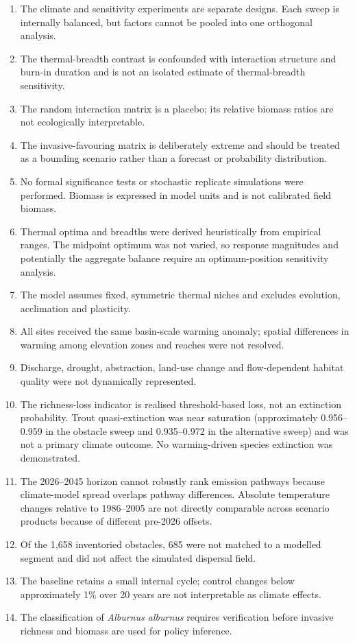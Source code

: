 \documentclass[11pt,a4paper]{article}
\begin{document}
\begin{enumerate}
    \item The climate and sensitivity experiments are separate designs. Each sweep is internally balanced, but factors cannot be pooled into one orthogonal analysis.
    \item The thermal-breadth contrast is confounded with interaction structure and burn-in duration and is not an isolated estimate of thermal-breadth sensitivity.
    \item The random interaction matrix is a placebo; its relative biomass ratios are not ecologically interpretable.
    \item The invasive-favouring matrix is deliberately extreme and should be treated as a bounding scenario rather than a forecast or probability distribution.
    \item No formal significance tests or stochastic replicate simulations were performed. Biomass is expressed in model units and is not calibrated field biomass.
    \item Thermal optima and breadths were derived heuristically from empirical ranges. The midpoint optimum was not varied, so response magnitudes and potentially the aggregate balance require an optimum-position sensitivity analysis.
    \item The model assumes fixed, symmetric thermal niches and excludes evolution, acclimation and plasticity.
    \item All sites received the same basin-scale warming anomaly; spatial differences in warming among elevation zones and reaches were not resolved.
    \item Discharge, drought, abstraction, land-use change and flow-dependent habitat quality were not dynamically represented.
    \item The richness-loss indicator is realised threshold-based loss, not an extinction probability. Trout quasi-extinction was near saturation (approximately 0.956--0.959 in the obstacle sweep and 0.935--0.972 in the alternative sweep) and was not a primary climate outcome. No warming-driven species extinction was demonstrated.
    \item The 2026--2045 horizon cannot robustly rank emission pathways because climate-model spread overlaps pathway differences. Absolute temperature changes relative to 1986--2005 are not directly comparable across scenario products because of different pre-2026 offsets.
    \item Of the 1,658 inventoried obstacles, 685 were not matched to a modelled segment and did not affect the simulated dispersal field.
    \item The baseline retains a small internal cycle; control changes below approximately 1\% over 20 years are not interpretable as climate effects.
    \item The classification of \textit{Alburnus alburnus} requires verification before invasive richness and biomass are used for policy inference.
\end{enumerate}
\end{document}
